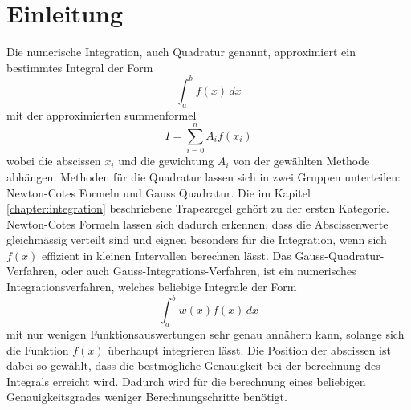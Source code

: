 %
%
%
\section{Einleitung\label{quadratur:section:einleitung}}

Die numerische Integration, auch Quadratur genannt, approximiert
 ein bestimmtes Integral der Form
\begin{equation}
    \int_{a}^{b} f(x) \,dx
\end{equation}
mit der approximierten summenformel 
\begin{equation}
    I = \sum_{i=0}^{n} A_i f(x_i)
\end{equation}
wobei die abscissen $x_i$ und die gewichtung $A_i$ von der gewählten 
Methode abhängen. 
Methoden für die Quadratur lassen sich in zwei Gruppen unterteilen: 
Newton-Cotes Formeln und Gauss Quadratur.
Die im Kapitel \ref{chapter:integration} beschriebene Trapezregel 
gehört zu der ersten Kategorie.
Newton-Cotes Formeln lassen sich dadurch erkennen, dass die Abscissenwerte 
gleichmässig verteilt sind und eignen besonders für die Integration, wenn sich $f(x)$ 
effizient in kleinen Intervallen berechnen lässt.
Das Gauss-Quadratur-Verfahren, oder auch Gauss-Integrations-Verfahren, 
ist ein numerisches Integrationsverfahren, welches beliebige Integrale der Form
\begin{equation}
\int_{a}^{b} w(x) f(x)\,dx
\end{equation}
mit nur wenigen Funktionsauswertungen sehr genau annähern kann, 
solange sich die Funktion $f(x)$ überhaupt integrieren lässt. 
Die Position der abscissen ist dabei so gewählt, 
dass die bestmögliche Genauigkeit bei der berechnung des Integrals erreicht wird.
Dadurch wird für die berechnung eines beliebigen Genauigkeitsgrades weniger Berechnungschritte benötigt.



